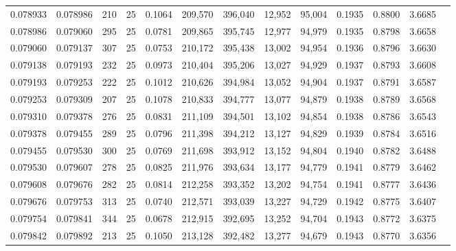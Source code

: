 \begin{tabular}{rrrrrrrrrrrrr}
0.078933 & 0.078986 &   210 &  25 &                                     0.1064 & 209,570 & 396,040 &  12,952 &  95,004 & 0.1935 & 0.8800 & 3.6685 \\
0.078986 & 0.079060 &   295 &  25 &                                     0.0781 & 209,865 & 395,745 &  12,977 &  94,979 & 0.1935 & 0.8798 & 3.6658 \\
0.079060 & 0.079137 &   307 &  25 &                                     0.0753 & 210,172 & 395,438 &  13,002 &  94,954 & 0.1936 & 0.8796 & 3.6630 \\
0.079138 & 0.079193 &   232 &  25 &                                     0.0973 & 210,404 & 395,206 &  13,027 &  94,929 & 0.1937 & 0.8793 & 3.6608 \\
0.079193 & 0.079253 &   222 &  25 &                                     0.1012 & 210,626 & 394,984 &  13,052 &  94,904 & 0.1937 & 0.8791 & 3.6587 \\
0.079253 & 0.079309 &   207 &  25 &                                     0.1078 & 210,833 & 394,777 &  13,077 &  94,879 & 0.1938 & 0.8789 & 3.6568 \\
0.079310 & 0.079378 &   276 &  25 &                                     0.0831 & 211,109 & 394,501 &  13,102 &  94,854 & 0.1938 & 0.8786 & 3.6543 \\
0.079378 & 0.079455 &   289 &  25 &                                     0.0796 & 211,398 & 394,212 &  13,127 &  94,829 & 0.1939 & 0.8784 & 3.6516 \\
0.079455 & 0.079530 &   300 &  25 &                                     0.0769 & 211,698 & 393,912 &  13,152 &  94,804 & 0.1940 & 0.8782 & 3.6488 \\
0.079530 & 0.079607 &   278 &  25 &                                     0.0825 & 211,976 & 393,634 &  13,177 &  94,779 & 0.1941 & 0.8779 & 3.6462 \\
0.079608 & 0.079676 &   282 &  25 &                                     0.0814 & 212,258 & 393,352 &  13,202 &  94,754 & 0.1941 & 0.8777 & 3.6436 \\
0.079676 & 0.079753 &   313 &  25 &                                     0.0740 & 212,571 & 393,039 &  13,227 &  94,729 & 0.1942 & 0.8775 & 3.6407 \\
0.079754 & 0.079841 &   344 &  25 &                                     0.0678 & 212,915 & 392,695 &  13,252 &  94,704 & 0.1943 & 0.8772 & 3.6375 \\
0.079842 & 0.079892 &   213 &  25 &                                     0.1050 & 213,128 & 392,482 &  13,277 &  94,679 & 0.1943 & 0.8770 & 3.6356 \\

\end{tabular}
